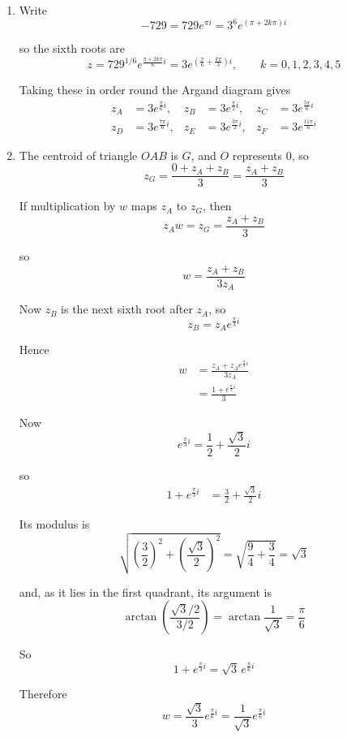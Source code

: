 \documentclass[leqno]{article}
\begin{document}
\begin{enumerate}[
  label=\textbf{\arabic*.},
  leftmargin=*,
  topsep=0pt,
  partopsep=0pt,
  parsep=0pt
]
\vspace*{10pt}

\begin{djsSolution}
\begin{enumerate}[label=\textbf{(\alph*)}]
  \item Write
\[
-729=729e^{\pi i}=3^6e^{(\pi+2k\pi)i}
\]

so the sixth roots are
\[
z=729^{1/6}e^{\frac{\pi+2k\pi}{6}i}=3e^{\left(\frac{\pi}{6}+\frac{k\pi}{3}\right)i},\qquad k=0,1,2,3,4,5
\]

Taking these in order round the Argand diagram gives
\begin{align*}
z_A&=3e^{\frac{\pi}{6}i},&
z_B&=3e^{\frac{\pi}{2}i},&
z_C&=3e^{\frac{5\pi}{6}i}\\
z_D&=3e^{\frac{7\pi}{6}i},&
z_E&=3e^{\frac{3\pi}{2}i},&
z_F&=3e^{\frac{11\pi}{6}i}
\end{align*}

  \item The centroid of triangle \(OAB\) is \(G\), and \(O\) represents \(0\), so
\[
z_G=\frac{0+z_A+z_B}{3}=\frac{z_A+z_B}{3}
\]

If multiplication by \(w\) maps \(z_A\) to \(z_G\), then
\[
z_Aw=z_G=\frac{z_A+z_B}{3}
\]

so
\[
w=\frac{z_A+z_B}{3z_A}
\]

Now \(z_B\) is the next sixth root after \(z_A\), so
\[
z_B=z_Ae^{\frac{\pi}{3}i}
\]

Hence
\begin{align*}
w&=\frac{z_A+z_Ae^{\frac{\pi}{3}i}}{3z_A}\\
&=\frac{1+e^{\frac{\pi}{3}i}}{3}
\end{align*}

Now
\[
e^{\frac{\pi}{3}i}=\frac12+\frac{\sqrt3}{2}i
\]

so
\begin{align*}
1+e^{\frac{\pi}{3}i}
&=\frac32+\frac{\sqrt3}{2}i
\end{align*}

Its modulus is
\[
\sqrt{\left(\frac32\right)^2+\left(\frac{\sqrt3}{2}\right)^2}
=\sqrt{\frac94+\frac34}
=\sqrt3
\]

and, as it lies in the first quadrant, its argument is
\[
\arctan\left(\frac{\sqrt3/2}{3/2}\right)=\arctan\frac{1}{\sqrt3}=\frac{\pi}{6}
\]

So
\[
1+e^{\frac{\pi}{3}i}=\sqrt3\,e^{\frac{\pi}{6}i}
\]

Therefore
\[
w=\frac{\sqrt3}{3}e^{\frac{\pi}{6}i}=\frac{1}{\sqrt3}e^{\frac{\pi}{6}i}
\]


\end{enumerate}
\end{djsSolution}
\end{enumerate}
\end{document}

